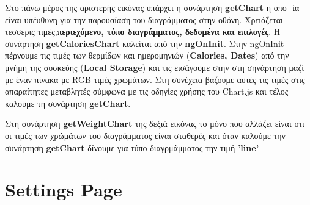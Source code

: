 \documentclass[a4paper,12pt]{article}
\begin{document}
		Στο πάνω μέρος της αριστερής εικόνας υπάρχει η συνάρτηση \textbf{getChart} η οπο-
		ία είναι υπέυθυνη για την παρουσίαση του διαγράμματος στην οθόνη. 
		Χρειάζεται τεσσερις τιμές,\textbf{περιεχόμενο, τύπο διαγράμματος, δεδομένα και επιλογές}. Η συνάρτηση \textbf{getCaloriesChart} καλείται 
		από την \textbf{ngOnInit}. Στην ngOnInit πέρνουμε τις τιμές των θερμίδων και ημερομηνιών (\textbf{Calories, Dates}) από την μνήμη της συσκεύης 
		(\textbf{Local Storage}) και τις εισάγουμε στην στη σηνάρτηση μαζί με έναν πίνακα με RGB τιμές χρωμάτων. 
		Στη συνέχεια βάζουμε αυτές τις τιμές στις απαραίτητες μεταβλητές σύμφωνα με τις οδηγίες χρήσης του Chart.js και τέλος καλούμε τη συνάρτηση 
		\textbf{getChart}.

		Στη συνάρτηση \textbf{getWeightChart} της δεξιά εικόνας το μόνο που αλλάζει είναι οτι οι τιμές των χρώμάτων του διαγράμματος
		είναι σταθερές και όταν καλούμε την συνάρτηση \textbf{getChart} δίνουμε για τύπο διαγρμάμματος την τιμή \textbf{'line'}
		\newpage
		\section{Settings Page}	
\end{document}
